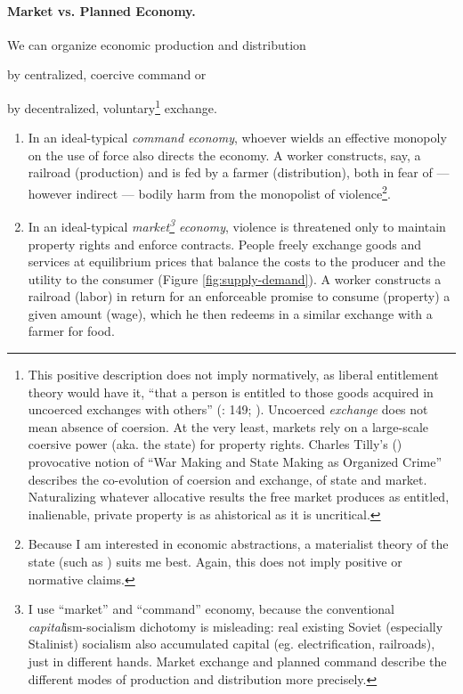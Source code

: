 \paragraph{Market vs. Planned Economy.} \label{sec:marketvscommand} We can organize economic production and distribution \begin{inparaenum}[1)] 
		\item by centralized, coercive command or
		\item by decentralized, voluntary\footnote{
				\label{fn:tilly}This positive description does not imply normatively, as liberal entitlement theory would have it, ``that a person is entitled to those goods acquired in uncoerced exchanges with others'' (\citealt{Nozick1974}: 149; \citealt{Friedman1962}). Uncoerced \emph{exchange} does not mean absence of coersion. At the very least, markets rely on a large-scale coersive power (aka. the state) for property rights. Charles Tilly's (\citeyear{Tilly-1985-aa}) provocative notion of ``War Making and State Making as Organized Crime'' describes the co-evolution of coersion and exchange, of state and market. Naturalizing whatever allocative results the free market produces as entitled, inalienable, private property is as ahistorical as it is uncritical.} 
			exchange. \end{inparaenum} 
	\begin{enumerate}
		\item In an ideal-typical \cite{Weber-1920-aa} \emph{command economy}, whoever wields an effective monopoly on the use of force also directs the economy. A worker constructs, say, a railroad (production) and is fed by a farmer (distribution), both in fear of --- however indirect --- bodily harm from the monopolist of violence\footnote{
				Because I am  interested in economic abstractions, a materialist theory of the state (such as \citealt{Tilly-1985-aa}) suits me best. Again, this does not imply positive or normative claims.}. 
		\item In an ideal-typical \emph{market\footnote{
				I use ``market'' and ``command'' economy, because the conventional \emph{capital}ism-socialism dichotomy is misleading: real existing Soviet (especially Stalinist) socialism also accumulated capital (eg. electrification, railroads), just in different hands. Market exchange and planned command describe the different modes of production and distribution more precisely.} 
			economy}, violence is threatened only to maintain property rights and enforce contracts. People freely exchange goods and services at equilibrium prices that balance the costs to the producer and the utility to the consumer (Figure \ref{fig:supply-demand}).  A worker constructs a railroad (labor) in return for an enforceable promise to consume (property) a given amount (wage), which he then redeems in a similar exchange with a farmer for food. 
	\end{enumerate}

